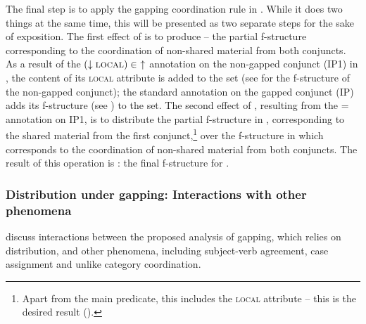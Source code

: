 \documentclass[output=paper]{../langscibook}
\begin{document}
\ea\label{ex:pat:prz:17:18:C2:obj}
  \z
\ea\label{ex:pat:prz:17:18:C2:obl}
\z
The final step is to apply the gapping coordination rule in
. While it does two things at the same time,
this will be presented as two separate steps for the sake of
exposition. The first effect of  is to produce
 – the partial f-structure corresponding to the
coordination of non-shared material from both conjuncts. As a result
of the \textsc{$(\downarrow \textsc{local}) \in\,\,\uparrow$}
annotation on the non-gapped conjunct (IP1) in
, the content of its \textsc{local} attribute
is added to the set (see  for the f-structure
of the non-gapped conjunct); the standard {\DOWN{$\in$}\UP}
annotation on the gapped conjunct (IP) adds its f-structure (see
) to the set.
The second effect of , resulting from the
{\DOWN=\UP} annotation on IP1, is to distribute the
partial f-structure in , corresponding to the
shared material from the first conjunct,\footnote{Apart from the main
  predicate, this includes the \textsc{local} attribute – this
  is the desired result ().} over the f-structure in
 which corresponds to the coordination of
non-shared material from both conjuncts. The result of this operation
is : the final f-structure for .

\subsubsection{Distribution under gapping: Interactions with other phenomena}
\label{sec:Coordination:ell:gap:interact}

\citet{PatejukPrzepiorkowski2017} discuss interactions between the proposed
analysis of gapping, which relies on distribution, and other
phenomena, including subject-verb agreement, case assignment and
unlike category coordination.
\end{document}
